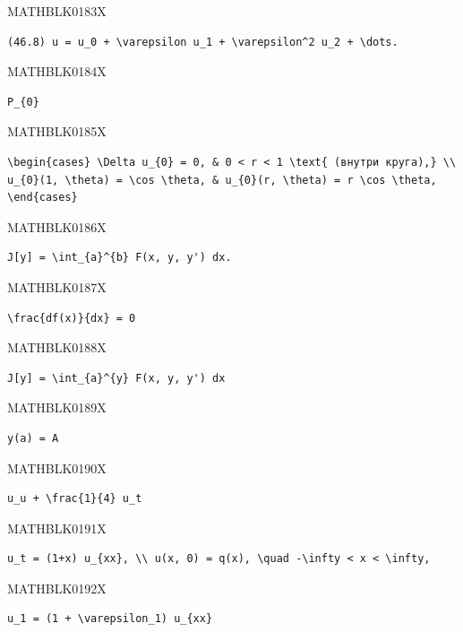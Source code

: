 \documentclass[
  ukrainian,
]{article}
\begin{document}
MATHBLK0183X

\begin{verbatim}
(46.8) u = u_0 + \varepsilon u_1 + \varepsilon^2 u_2 + \dots.
\end{verbatim}

MATHBLK0184X

\begin{verbatim}
P_{0}
\end{verbatim}

MATHBLK0185X

\begin{verbatim}
\begin{cases} \Delta u_{0} = 0, & 0 < r < 1 \text{ (внутри круга),} \\ u_{0}(1, \theta) = \cos \theta, & u_{0}(r, \theta) = r \cos \theta, \end{cases}
\end{verbatim}

MATHBLK0186X

\begin{verbatim}
J[y] = \int_{a}^{b} F(x, y, y') dx.
\end{verbatim}

MATHBLK0187X

\begin{verbatim}
\frac{df(x)}{dx} = 0
\end{verbatim}

MATHBLK0188X

\begin{verbatim}
J[y] = \int_{a}^{y} F(x, y, y') dx
\end{verbatim}

MATHBLK0189X

\begin{verbatim}
y(a) = A
\end{verbatim}

MATHBLK0190X

\begin{verbatim}
u_u + \frac{1}{4} u_t
\end{verbatim}

MATHBLK0191X

\begin{verbatim}
u_t = (1+x) u_{xx}, \\ u(x, 0) = q(x), \quad -\infty < x < \infty,
\end{verbatim}

MATHBLK0192X

\begin{verbatim}
u_1 = (1 + \varepsilon_1) u_{xx}
\end{verbatim}
\end{document}
